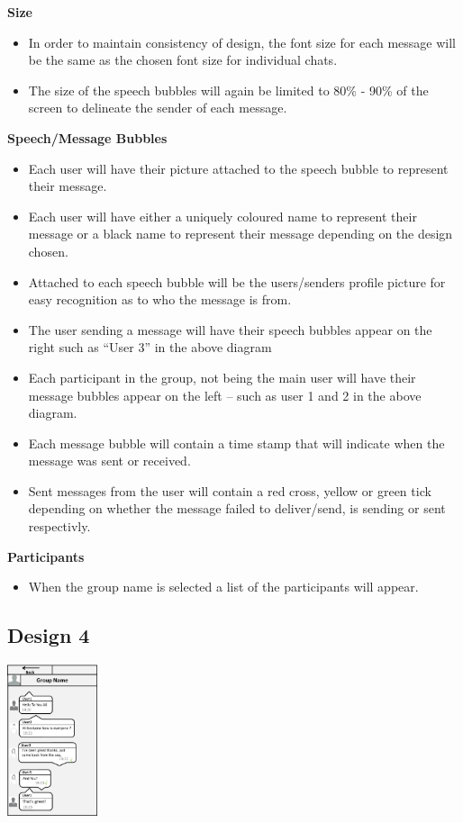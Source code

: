 \documentclass[11pt]{article}
\begin{document}
\textbf{Size}\\
\begin{itemize}
\item	In order to maintain consistency of design, the font size for each message will be the same as the chosen font size for individual chats.
\item	The size of the speech bubbles will again be limited to 80\% - 90\% of the screen to delineate the sender of each message. \\
\end{itemize}

\textbf{Speech/Message Bubbles}\\
\begin{itemize}
\item	Each user will have their picture attached to the speech bubble to represent their message.
\item	Each user will have either a uniquely coloured name to represent their message or a black name to represent their message depending on the design chosen.
\item	Attached to each speech bubble will be the users/senders profile picture for easy recognition as to who the message is from.
\item	The user sending a message will have their speech bubbles appear on the right such as “User 3” in the above diagram
\item	Each participant in the group, not being the main user will have their message bubbles appear on the left – such as user 1 and 2 in the above diagram.
\item Each message bubble will contain a time stamp that will indicate when the message was sent or received.
\item Sent messages from the user will contain a red cross, yellow or green tick depending on whether the message failed to deliver/send, is sending or sent respectivly.\\
\end{itemize}

\textbf{Participants}\\
\begin{itemize}
\item	When the group name is selected a list of the participants will appear.
\end{itemize}

\newpage
\subsection{Design 4}
\centerline{\includegraphics[width=100px]{D04.jpg}}
\end{document}
